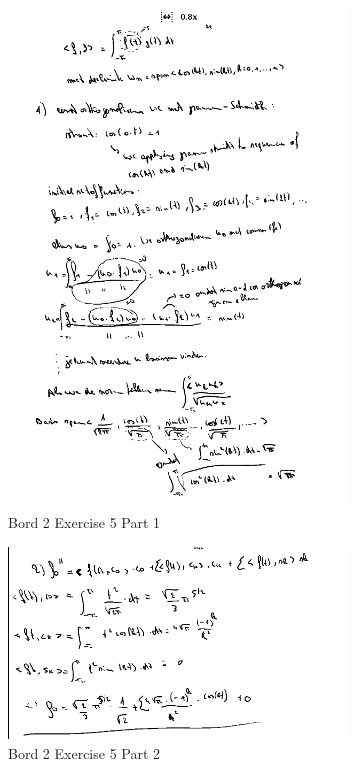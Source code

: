 \documentclass[a4paper]{article}
\begin{document}
\begin{figure}[H]
	\centering
	\includegraphics[width=0.8\textwidth]{assets/bord_2_ex_5_part_1.png}
	\caption{Bord 2 Exercise 5 Part 1}
	\label{fig:bord_2_ex_5_part_1}
\end{figure}


\begin{figure}[H]
	\centering
	\includegraphics[width=0.8\textwidth]{assets/bord_2_ex_5_part_2.png}
	\caption{Bord 2 Exercise 5 Part 2}
	\label{fig:bord_2_ex_5_part_2}
\end{figure}
\end{document}
